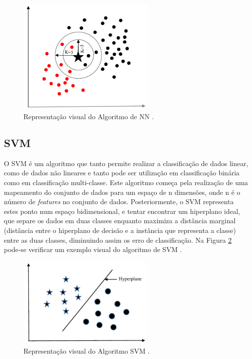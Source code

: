 \documentclass[12pt,a4paper,twoside]{report}
\begin{document}
{\begin{figure}[H]
    \centering
    \includegraphics[width=0.6\textwidth]{imagens/KNN.png}
    \caption{Representação visual do Algoritmo de \gls{NN} \cite{Uddin2019ComparingDS}.}
    \label{fig:knn}
\end{figure}


\subsection{\gls{SVM}}

O \gls{SVM} é um algoritmo que tanto permite realizar a classificação de dados linear, como de dados não lineares e tanto pode ser utilização em classificação binária como em classificação multi-classe. Este algoritmo começa pela realização de uma mapeamento do conjunto de dados para um espaço de n dimensões, onde n é o número de \textit{features} no conjunto de dados. Posteriormente, o \gls{SVM} representa estes ponto num espaço bidimensional, e tentar encontrar um hiperplano ideal, que separe os dados em duas classes enquanto maximiza a distância marginal (distância entre o hiperplano de decisão e a instância que representa a classe) entre as duas classes, diminuindo assim os erro de classificação. Na Figura \ref{fig:svm} pode-se verificar um exemplo visual do algoritmo de \gls{SVM} \cite{Uddin2019ComparingDS}.

\begin{figure}[H]
    \centering
    \includegraphics[width=0.6\textwidth]{imagens/svm.png}
    \caption{Representação visual do Algoritmo \gls{SVM} \cite{Uddin2019ComparingDS}.}
    \label{fig:svm}
\end{figure}


}
\end{document}
